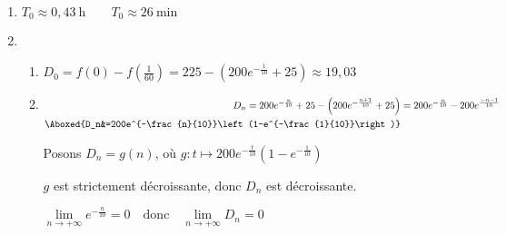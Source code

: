 \documentclass{scrartcl}
\begin{document}
\begin{adjustwidth}{2em}{0pt}
\begin{enumerate}
            \item   $T_0\approx 0{,}43\ \text{h}\qquad\boxed{T_0\approx 26\ \text{min}}$
            \item   \begin{enumerate}[label=\alph*)]
                        \item	$D_0=f(0)-f\left(\frac{1}{60}\right)=225-\left(200e^{-\frac{1}{10}}+25\right)\approx 19{,}03$ \par
                        \item   $\begin{aligned}[t]
                                    D_n=200e^{-\frac{n}{10}}+25-\left(200e^{-\frac{n+1}{10}}+25\right)&=200e^{-\frac{n}{10}}-200e^{\frac{-n-1}{10}} \\
                                    \Aboxed{D_n&=200e^{-\frac{n}{10}}\left(1-e^{-\frac{1}{10}}\right)}
                                \end{aligned}$ \par \vspace{1em}
                                Posons $D_n=g(n)$, où $g:t\mapsto 200e^{-\frac{t}{10}}\left(1-e^{-\frac{1}{10}}\right)$ \par
                                $g$ est strictement décroissante, donc $D_n$ est décroissante. \par
                                $\lim\limits_{n\to +\infty}e^{-\frac{n}{10}}=0\quad\text{donc}\quad\lim\limits_{n\to +\infty}D_n=0$ \par
                    \end{enumerate}
        \end{enumerate}
    \end{adjustwidth}
\end{document}
